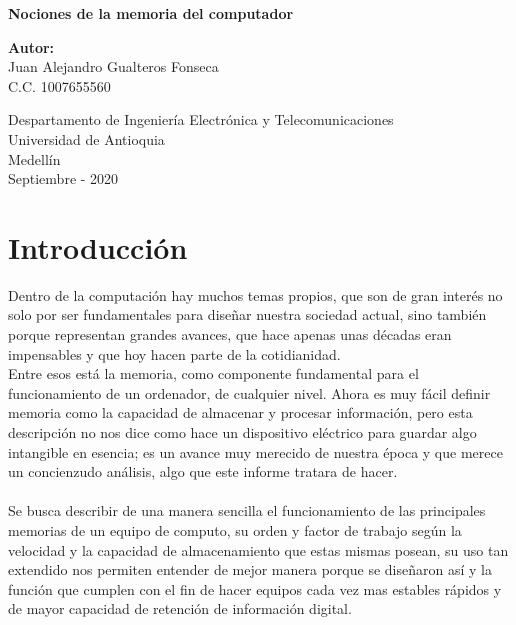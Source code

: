\documentclass{article}
\begin{document}
	
	\begin{titlepage}
		\begin{center}
			\vspace*{1cm}
			
			\Huge{\textbf{Nociones de la memoria del computador}}
			
			\vspace{7cm}
			
			\Large{\textbf{Autor:}\\Juan Alejandro Gualteros Fonseca}
			\\
			\large{C.C. 1007655560}
			
			\vfill
			
			\vspace{0.5cm}
			
			\Large
			Despartamento de Ingeniería Electrónica y Telecomunicaciones\\
			Universidad de Antioquia\\
			Medellín\\
			Septiembre - 2020
			
		\end{center}
	\end{titlepage}
	
	\newpage
	
	\tableofcontents
	
	\newpage
	
	\section{Introducción}\label{intro}
	Dentro de la computación hay muchos temas propios, que son de gran interés no solo por ser fundamentales para diseñar nuestra sociedad actual, sino también porque representan grandes avances, que hace apenas unas décadas eran impensables y que hoy hacen parte de la cotidianidad.\\
	Entre esos está la memoria, como componente fundamental para el funcionamiento de un ordenador, de cualquier nivel. Ahora es muy fácil definir memoria como la capacidad de almacenar y procesar información, pero esta descripción no nos dice como hace un dispositivo eléctrico para guardar algo intangible en esencia; es un avance muy merecido de nuestra época y que merece un concienzudo análisis, algo que este informe tratara de hacer.
	\\\\
	Se busca describir de una manera sencilla el funcionamiento de las principales memorias de un equipo de computo, su orden y factor de trabajo según la velocidad y la capacidad de almacenamiento que estas mismas posean, su uso tan extendido nos permiten entender de mejor manera porque se diseñaron así y la función que cumplen con el fin de hacer equipos cada vez mas estables rápidos y de mayor capacidad de retención de información digital.
	
\end{document}
